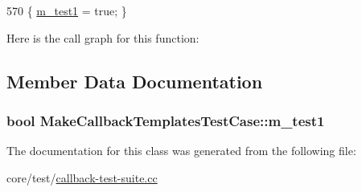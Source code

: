 \begin{DoxyCode}
570 \{ \hyperlink{classMakeCallbackTemplatesTestCase_a30115f5d278393bbf6512095fb307ead}{m\_test1} = \textcolor{keyword}{true}; \}
\end{DoxyCode}


Here is the call graph for this function\+:




\subsection{Member Data Documentation}
\subsubsection[{\texorpdfstring{m\+\_\+test1}{m_test1}}]{\setlength{\rightskip}{0pt plus 5cm}bool Make\+Callback\+Templates\+Test\+Case\+::m\+\_\+test1\hspace{0.3cm}{\ttfamily [private]}}\hypertarget{classMakeCallbackTemplatesTestCase_a30115f5d278393bbf6512095fb307ead}{}\label{classMakeCallbackTemplatesTestCase_a30115f5d278393bbf6512095fb307ead}


The documentation for this class was generated from the following file\+:\begin{DoxyCompactItemize}
\item 
core/test/\hyperlink{callback-test-suite_8cc}{callback-\/test-\/suite.\+cc}\end{DoxyCompactItemize}
